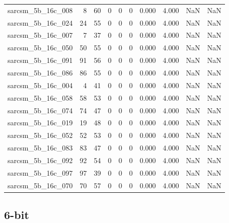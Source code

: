 \documentclass{article}
\begin{document}
\begin{longtable}{lrrrrrrrrr}
sarcsm\_5b\_16c\_008 & 8 & 60 & 0 & 0 & 0 & 0.000 & 4.000 & NaN & NaN \\
sarcsm\_5b\_16c\_024 & 24 & 55 & 0 & 0 & 0 & 0.000 & 4.000 & NaN & NaN \\
sarcsm\_5b\_16c\_007 & 7 & 37 & 0 & 0 & 0 & 0.000 & 4.000 & NaN & NaN \\
sarcsm\_5b\_16c\_050 & 50 & 55 & 0 & 0 & 0 & 0.000 & 4.000 & NaN & NaN \\
sarcsm\_5b\_16c\_091 & 91 & 56 & 0 & 0 & 0 & 0.000 & 4.000 & NaN & NaN \\
sarcsm\_5b\_16c\_086 & 86 & 55 & 0 & 0 & 0 & 0.000 & 4.000 & NaN & NaN \\
sarcsm\_5b\_16c\_004 & 4 & 41 & 0 & 0 & 0 & 0.000 & 4.000 & NaN & NaN \\
sarcsm\_5b\_16c\_058 & 58 & 53 & 0 & 0 & 0 & 0.000 & 4.000 & NaN & NaN \\
sarcsm\_5b\_16c\_074 & 74 & 47 & 0 & 0 & 0 & 0.000 & 4.000 & NaN & NaN \\
sarcsm\_5b\_16c\_019 & 19 & 48 & 0 & 0 & 0 & 0.000 & 4.000 & NaN & NaN \\
sarcsm\_5b\_16c\_052 & 52 & 53 & 0 & 0 & 0 & 0.000 & 4.000 & NaN & NaN \\
sarcsm\_5b\_16c\_083 & 83 & 47 & 0 & 0 & 0 & 0.000 & 4.000 & NaN & NaN \\
sarcsm\_5b\_16c\_092 & 92 & 54 & 0 & 0 & 0 & 0.000 & 4.000 & NaN & NaN \\
sarcsm\_5b\_16c\_097 & 97 & 39 & 0 & 0 & 0 & 0.000 & 4.000 & NaN & NaN \\
sarcsm\_5b\_16c\_070 & 70 & 57 & 0 & 0 & 0 & 0.000 & 4.000 & NaN & NaN \\
\end{longtable}

\subsection*{6-bit}
\end{document}
